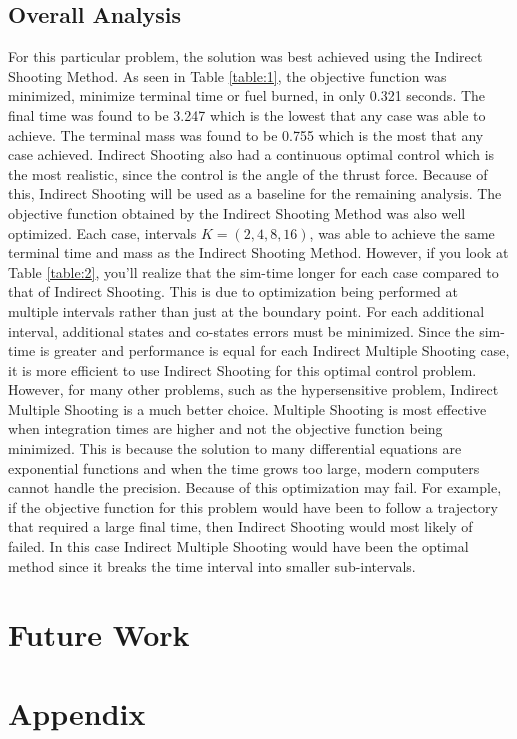 \documentclass[]{article}
\begin{document}
\subsection{Overall Analysis}
For this particular problem, the solution was best achieved using the Indirect Shooting Method. As seen in Table \ref{table:1}, the objective function was minimized, minimize terminal time or fuel burned, in only 0.321 seconds. The final time was found to be 3.247 which is the lowest that any case was able to achieve. The terminal mass was found to be 0.755 which is the most that any case achieved. Indirect Shooting also had a continuous optimal control which is the most realistic, since the control is the angle of the thrust force. Because of this, Indirect Shooting will be used as a baseline for the remaining analysis. The objective function obtained by the Indirect Shooting Method was also well optimized. Each case, intervals \(K = (2,4,8,16)\), was able to achieve the same terminal time and mass as the Indirect Shooting Method. However, if you look at Table \ref{table:2}, you'll realize that the sim-time longer for each case compared to that of Indirect Shooting. This is due to optimization being performed at multiple intervals rather than just at the boundary point. For each additional interval, additional states and co-states errors must be minimized. Since the sim-time is greater and performance is equal for each Indirect Multiple Shooting case, it is more efficient to use Indirect Shooting for this optimal control problem. However, for many other problems, such as the hypersensitive problem, Indirect Multiple Shooting is a much better choice. Multiple Shooting is most effective when integration times are higher and not the objective function being minimized. This is because the solution to many differential equations are exponential functions and when the time grows too large, modern computers cannot handle the precision. Because of this optimization may fail. For example, if the objective function for this problem would have been to follow a trajectory that required a large final time, then Indirect Shooting would most likely of failed. In this case Indirect Multiple Shooting would have been the optimal method since it breaks the time interval into smaller sub-intervals. 

\section{Future Work}

\section{Appendix}
\end{document}
